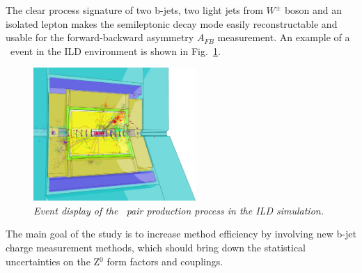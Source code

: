 The clear process signature of two b-jets, two light jets from $W^\pm$ boson and an isolated lepton makes the semileptonic decay mode easily reconstructable and usable for the forward-backward asymmetry $A_{FB}$ measurement. 
An example of a \ttbar\ event in the ILD environment is shown in Fig.~\ref{fig:TopEvent_3}.

\begin{figure}[h]
	{\centering
		\includegraphics[width=0.55\textwidth]{ILD/graphics/ild-ttbar.png}
		\caption{\sl Event display of the \ttbar\ pair production process in the ILD simulation.
		}
		\label{fig:TopEvent_3}
	}
	
\end{figure}

The main goal of the study is to increase method efficiency by involving new b-jet charge measurement methods, which should bring down the statistical uncertainties on the \ttbar Z$^0$ form factors and couplings.  


